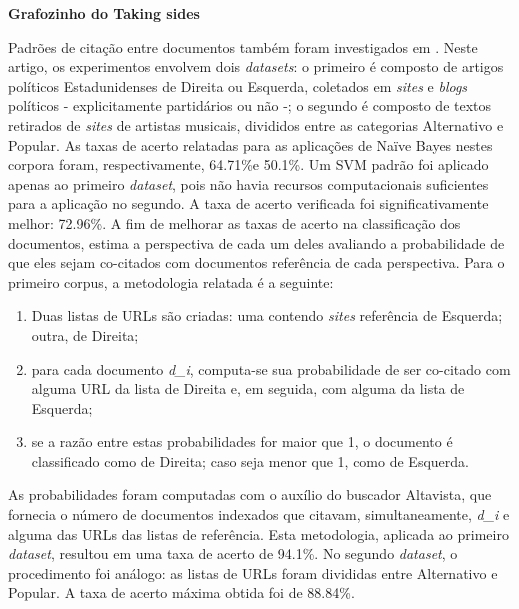 \textbf{Grafozinho do Taking sides}

Padrões de citação entre documentos também foram investigados em \cite{efron}. Neste artigo, os experimentos envolvem dois \emph{datasets}: o primeiro é composto de artigos políticos Estadunidenses de Direita ou Esquerda, coletados em \emph{sites} e \emph{blogs} políticos - explicitamente partidários ou não -; o segundo é composto de textos retirados de \emph{sites} de artistas musicais, divididos entre as categorias Alternativo e Popular. As taxas de acerto relatadas para as aplicações de Naïve Bayes nestes corpora foram, respectivamente, 64.71\%e 50.1\%. Um SVM padrão foi aplicado apenas ao primeiro \emph{dataset}, pois não havia recursos computacionais suficientes para a aplicação no segundo. A taxa de acerto verificada foi significativamente melhor: 72.96\%. A fim de melhorar as taxas de acerto na classificação dos documentos, \cite{efron} estima a perspectiva de cada um deles avaliando a probabilidade de que eles sejam co-citados com documentos referência de cada perspectiva. Para o primeiro corpus, a metodologia relatada é a seguinte:

\begin{enumerate}
  \item Duas listas de URLs são criadas: uma contendo \emph{sites} referência de Esquerda; outra, de Direita;
  \item para cada documento \emph{d\_i}, computa-se sua probabilidade de ser co-citado com alguma URL da lista de Direita e, em seguida, com alguma da lista de Esquerda;
  \item se a razão entre estas probabilidades for maior que 1, o documento é classificado como de Direita; caso seja menor que 1, como de Esquerda.

\end{enumerate}

As probabilidades foram computadas com o auxílio do buscador Altavista, que fornecia o número de documentos indexados que citavam, simultaneamente, \emph{d\_i} e alguma das URLs das listas de referência. Esta metodologia, aplicada ao primeiro \emph{dataset}, resultou em uma taxa de acerto de 94.1\%. No segundo \emph{dataset}, o procedimento foi análogo: as listas de URLs foram divididas entre Alternativo e Popular. A taxa de acerto máxima obtida foi de 88.84\%.


